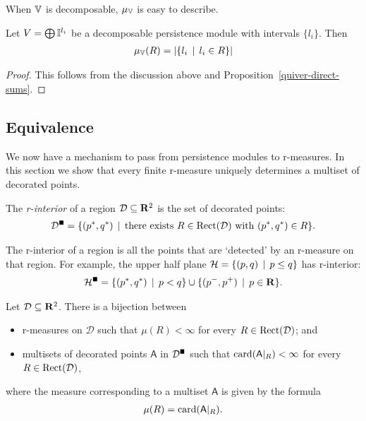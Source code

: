 When $\mathbb{V}$ is decomposable, $\mu_{\mathbb{V}}$ is easy to describe.

\begin{proposition}
\label{prop-decomposable-diagram}
Let $V = \bigoplus \mathbb{I}^{l_i}$ be a decomposable persistence module with intervals $\{ l_i \}$. Then
\begin{align*}
\mu_{\mathbb{V}}(R) = \left | \{ l_i \, \mid \, l_i \in R \} \right |
\end{align*}
\end{proposition}
\begin{proof}
This follows from the discussion above and Proposition~\ref{quiver-direct-sums}.
\end{proof}

\subsection{Equivalence}

We now have a mechanism to pass from persistence modules to r-measures. In this section we show that every finite r-measure uniquely determines a multiset of decorated points.

\begin{definition}
The \emph{r-interior} of a region $\mathcal{D} \subseteq \mathbf{R}^2$ is the set of decorated points:
\begin{align*}
\mathcal{D}^\rint = \{ (p^*, q^*) \st \text{there exists } R \in \Rect(\mathcal{D}) \text{ with } (p^*, q^*) \in R \}.
\end{align*}
\end{definition}

The r-interior of a region is all the points that are `detected' by an r-measure on that region. For example, the upper half plane $\mathcal{H} = \{ (p, q) \, \mid \, p \leq q \}$ has r-interior:
\begin{align*}
\mathcal{H}^\rint = \{ (p^*, q^*) \st p < q \} \cup \{ (p^-, p^+) \st p \in \R \}.
\end{align*}

\begin{theorem}[Equivalence]\label{r-measure-equivalence}
Let $\mathcal{D} \subseteq \mathbf{R}^2$. There is a bijection between 
\begin{itemize}
\item r-measures on $\mathcal{D}$ such that $\mu(R) < \infty$ for every $R \in \operatorname{Rect}(\mathcal{D})$; and
\item multisets of decorated points $\mathsf{A}$ in $\mathcal{D}^\rint$ such that $\operatorname{card}(\mathsf{A}|_R) < \infty$ for every $R \in \operatorname{Rect}(\mathcal{D})$,
\end{itemize}
where the measure corresponding to a multiset $\mathsf{A}$ is given by the formula
\begin{align*}
\mu(R) = \operatorname{card}(\mathsf{A}|_R).
\end{align*}
\end{theorem} 

